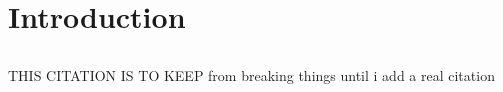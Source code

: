 \section{Introduction}   \label{chap:introduction}

\subsection{}

THIS CITATION IS TO KEEP from breaking things until i add a real citation
\cite{WSULibrary}

